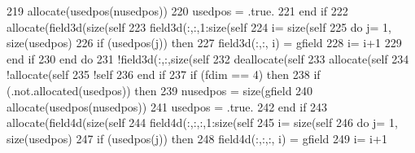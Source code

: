 \begin{DoxyCode}
{{{{{{219                 \textcolor{keyword}{allocate}(usedpos(nusedpos))
220                 usedpos = .true.
221 \textcolor{keywordflow}{            end if}
222             \textcolor{keyword}{allocate}(field3d(\textcolor{keyword}{size}(self%
223             field3d(:,:,1:\textcolor{keyword}{size}(self%
224             i= \textcolor{keyword}{size}(self%
225             \textcolor{keywordflow}{do} j= 1, \textcolor{keyword}{size}(usedpos)
226                 \textcolor{keywordflow}{if} (usedpos(j)) \textcolor{keywordflow}{then}
227                     field3d(:,:, i) = gfield%
228                     i= i+1
229 \textcolor{keywordflow}{                end if}
230 \textcolor{keywordflow}{            end do}
231             \textcolor{comment}{!field3d(:,:,size(self%
232             \textcolor{keyword}{deallocate}(self%
233             \textcolor{keyword}{allocate}(self%
234             \textcolor{comment}{!allocate(self%
235             \textcolor{comment}{!self%
236 \textcolor{keywordflow}{        end if}
237         \textcolor{keywordflow}{if} (fdim == 4) \textcolor{keywordflow}{then}
238             \textcolor{keywordflow}{if} (.not.\textcolor{keyword}{allocated}(usedpos)) \textcolor{keywordflow}{then}
239                 nusedpos = \textcolor{keyword}{size}(gfield%
240                 \textcolor{keyword}{allocate}(usedpos(nusedpos))
241                 usedpos = .true.
242 \textcolor{keywordflow}{            end if}
243             \textcolor{keyword}{allocate}(field4d(\textcolor{keyword}{size}(self%
244             field4d(:,:,:,1:\textcolor{keyword}{size}(self%
245              i= \textcolor{keyword}{size}(self%
246             \textcolor{keywordflow}{do} j= 1, \textcolor{keyword}{size}(usedpos)
247                 \textcolor{keywordflow}{if} (usedpos(j)) \textcolor{keywordflow}{then}
248                     field4d(:,:,:, i) = gfield%
249                     i= i+1
}}}}}}}}}
\end{DoxyCode}
